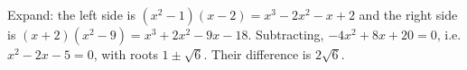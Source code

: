 Expand: the left side is $(x^2-1)(x-2)=x^3-2x^2-x+2$ and the right side is $(x+2)(x^2-9)=x^3+2x^2-9x-18$. Subtracting, $-4x^2+8x+20=0$, i.e. $x^2-2x-5=0$, with roots $1\pm\sqrt6$. Their difference is $\boxed{2\sqrt6}$.
